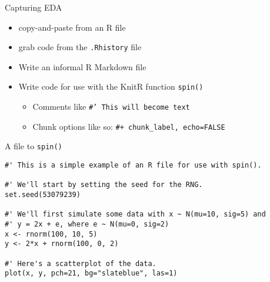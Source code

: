 \documentclass[12pt,t]{beamer}
\newcommand{\hilit}{\color{hilit}}
\newcommand{\bi}{\begin{itemize}}
\newcommand{\ei}{\end{itemize}}
\begin{document}
\begin{frame}{Capturing EDA}

\vspace{24pt}

\bi
\item copy-and-paste from an R file
\item grab code from the {\tt .Rhistory} file
\item Write an informal R Markdown file
\item Write code for use with the KnitR function {\tt spin()}
\bi
\item[] Comments like \; {\hilit \tt \#' This will become text}
\item[] Chunk options like so: \; {\hilit \tt \#+ chunk\_label, echo=FALSE}
\ei
\ei

\end{frame}


\begin{frame}[fragile]{A file to {\tt spin()}}

\vspace{24pt}

\begin{lstlisting}
#' This is a simple example of an R file for use with spin().

#' We'll start by setting the seed for the RNG.
set.seed(53079239)

#' We'll first simulate some data with x ~ N(mu=10, sig=5) and
#' y = 2x + e, where e ~ N(mu=0, sig=2)
x <- rnorm(100, 10, 5)
y <- 2*x + rnorm(100, 0, 2)

#' Here's a scatterplot of the data.
plot(x, y, pch=21, bg="slateblue", las=1)
\end{lstlisting}

\end{frame}
\end{document}
